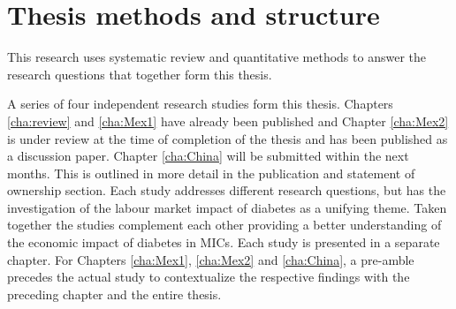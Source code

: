 \section{Thesis methods and structure}

This research uses systematic review and quantitative methods to answer the research questions that together form this thesis.

A series of four independent research studies form this thesis. Chapters \ref{cha:review} and \ref{cha:Mex1} have already been published and Chapter \ref{cha:Mex2} is under review at the time of completion of the thesis and has been published as a discussion paper. Chapter \ref{cha:China} will be submitted within the next months. This is outlined in more detail in the publication and statement of ownership section. Each study addresses different research questions, but has the investigation of the labour market impact of diabetes as a unifying theme. Taken together the studies complement each other providing a better understanding of the economic impact of diabetes in \acp{MIC}. Each study is presented in a separate chapter. For Chapters \ref{cha:Mex1}, \ref{cha:Mex2} and \ref{cha:China}, a pre-amble precedes the actual study to contextualize the respective findings with the preceding chapter and the entire thesis.


